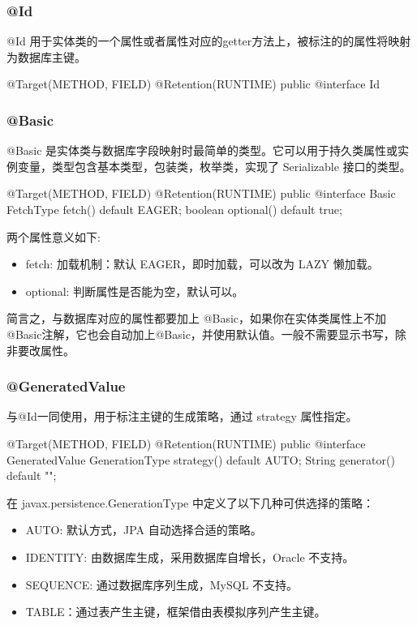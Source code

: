 \subsubsection{@Id}

@Id 用于实体类的一个属性或者属性对应的getter方法上，被标注的的属性将映射为数据库主键。

\begin{Java}
@Target({METHOD, FIELD})
@Retention(RUNTIME)
public @interface Id {}
\end{Java}

\subsubsection{@Basic}

@Basic 是实体类与数据库字段映射时最简单的类型。它可以用于持久类属性或实例变量，类型包含基本类型，包装类，枚举类，实现了 Serializable 接口的类型。

\begin{Java}
@Target({METHOD, FIELD}) 
@Retention(RUNTIME)
public @interface Basic {
    FetchType fetch() default EAGER;
    boolean optional() default true;
}
\end{Java}

两个属性意义如下:
\begin{itemize}
    \item fetch: 加载机制：默认 EAGER，即时加载，可以改为 LAZY 懒加载。
    \item optional: 判断属性是否能为空，默认可以。
\end{itemize}


简言之，与数据库对应的属性都要加上 @Basic，如果你在实体类属性上不加@Basic注解，它也会自动加上@Basic，并使用默认值。一般不需要显示书写，除非要改属性。

\subsubsection{@GeneratedValue}

与@Id一同使用，用于标注主键的生成策略，通过 strategy 属性指定。

\begin{Java}
@Target({METHOD, FIELD})
@Retention(RUNTIME)
public @interface GeneratedValue {
    GenerationType strategy() default AUTO;
    String generator() default "";
}
\end{Java}

在 javax.persistence.GenerationType 中定义了以下几种可供选择的策略：
\begin{itemize}
    \item AUTO: 默认方式，JPA 自动选择合适的策略。
    \item IDENTITY: 由数据库生成，采用数据库自增长，Oracle 不支持。
    \item SEQUENCE: 通过数据库序列生成，MySQL 不支持。
    \item TABLE：通过表产生主键，框架借由表模拟序列产生主键。
\end{itemize}

